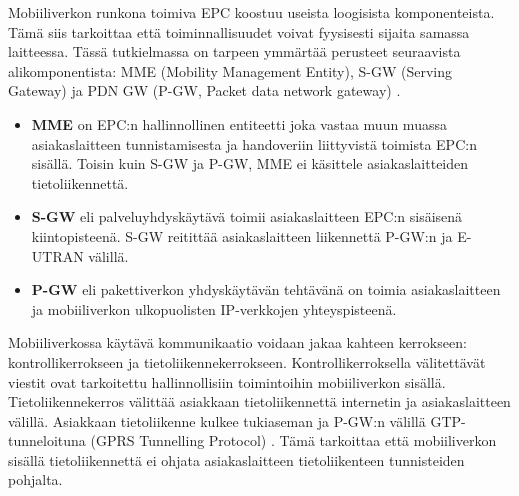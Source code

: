 Mobiiliverkon runkona toimiva EPC koostuu useista loogisista komponenteista.
Tämä siis tarkoittaa että toiminnallisuudet voivat fyysisesti sijaita samassa laitteessa. 
Tässä tutkielmassa on tarpeen ymmärtää perusteet seuraavista alikomponentista: MME (Mobility Management Entity), S-GW (Serving Gateway) ja PDN GW (P-GW, Packet data network gateway) \cite{etsilte}.
\begin{itemize}
\item \textbf{MME} on EPC:n hallinnollinen entiteetti joka vastaa muun muassa asiakaslaitteen tunnistamisesta ja handoveriin liittyvistä toimista EPC:n sisällä. Toisin kuin S-GW ja P-GW, MME ei käsittele asiakaslaitteiden tietoliikennettä.
\item \textbf{S-GW} eli palveluyhdyskäytävä toimii asiakaslaitteen EPC:n sisäisenä kiintopisteenä.  S-GW reitittää asiakaslaitteen liikennettä P-GW:n ja E-UTRAN välillä.
\item \textbf{P-GW} eli pakettiverkon yhdyskäytävän tehtävänä on toimia asiakaslaitteen ja mobiiliverkon ulkopuolisten IP-verkkojen yhteyspisteenä.
\end{itemize}
\cite{3gppepc}

Mobiiliverkossa käytävä kommunikaatio voidaan jakaa kahteen kerrokseen: kontrollikerrokseen ja tietoliikennekerrokseen.
Kontrollikerroksella välitettävät viestit ovat tarkoitettu hallinnollisiin toimintoihin mobiiliverkon sisällä. 
Tietoliikennekerros välittää asiakkaan tietoliikennettä internetin ja asiakaslaitteen välillä.
Asiakkaan tietoliikenne kulkee tukiaseman ja P-GW:n välillä GTP-tunneloituna (GPRS Tunnelling Protocol) \cite{puente15seamless}. Tämä tarkoittaa että mobiiliverkon sisällä tietoliikennettä ei ohjata asiakaslaitteen tietoliikenteen tunnisteiden pohjalta. 
